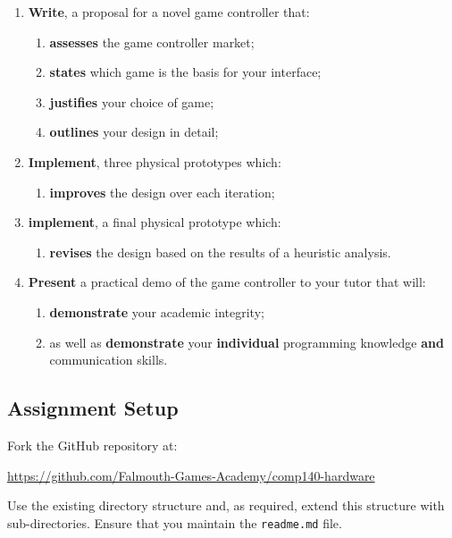 \documentclass{../fal_assignment}
\begin{document}
\begin{enumerate}[label=(\Alph*)]
    \item \textbf{Write}, a proposal for a novel game controller that:
    	\begin{enumerate}[label=\roman*.]
		\item \textbf{assesses} the game controller market;
    		\item \textbf{states} which game is the basis for your interface;
    		\item \textbf{justifies} your choice of game;
		\item \textbf{outlines} your design in detail;
	\end{enumerate}
    \item \textbf{Implement}, three physical prototypes which:
    	\begin{enumerate}[label=\roman*.]
		\item \textbf{improves} the design over each iteration;
	\end{enumerate}
    \item \textbf{implement}, a final physical prototype which:
    	\begin{enumerate}[label=\roman*.]
		\item \textbf{revises} the design based on the results of a heuristic analysis.
	\end{enumerate}
    \item \textbf{Present} a practical demo of the game controller to your tutor that will:
    	\begin{enumerate}[label=\roman*.]
    		\item \textbf{demonstrate} your academic integrity;
    		\item as well as \textbf{demonstrate} your \textbf{individual} programming knowledge \textbf{and} communication skills.
	\end{enumerate}
\end{enumerate}

\subsection*{Assignment Setup}

Fork the GitHub repository at:

\indent \url{https://github.com/Falmouth-Games-Academy/comp140-hardware }

Use the existing directory structure and, as required, extend this structure with sub-directories. Ensure that you maintain the \texttt{readme.md} file.
\end{document}
